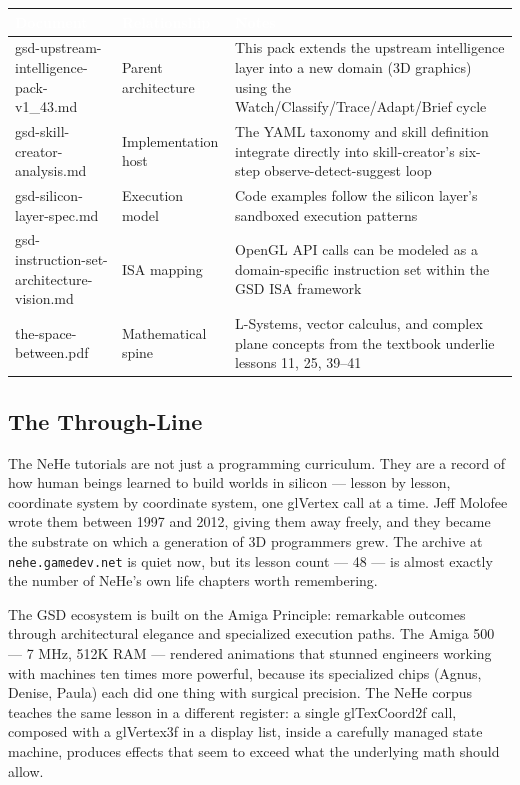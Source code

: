 \documentclass[11pt,letterpaper]{article}
\newcommand{\tableheader}[1]{\textbf{\sffamily\textcolor{white}{#1}}}
\begin{document}
\begin{center}
\begin{tabularx}{\textwidth}{L{4.5cm}L{2.5cm}X}
\toprule
{}
\tableheader{Document} & \tableheader{Relationship} & \tableheader{Notes} \\
\midrule
gsd-upstream-intelligence-pack-v1\_43.md & Parent architecture & This pack extends the upstream intelligence layer into a new domain (3D graphics) using the Watch/Classify/Trace/Adapt/Brief cycle \\
gsd-skill-creator-analysis.md & Implementation host & The YAML taxonomy and skill definition integrate directly into skill-creator's six-step observe-detect-suggest loop \\
gsd-silicon-layer-spec.md & Execution model & Code examples follow the silicon layer's sandboxed execution patterns \\
gsd-instruction-set-architecture-vision.md & ISA mapping & OpenGL API calls can be modeled as a domain-specific instruction set within the GSD ISA framework \\
the-space-between.pdf & Mathematical spine & L-Systems, vector calculus, and complex plane concepts from the textbook underlie lessons 11, 25, 39--41 \\
\bottomrule
\end{tabularx}
\end{center}

\subsection{The Through-Line}

The NeHe tutorials are not just a programming curriculum. They are a record of how human beings learned to build worlds in silicon --- lesson by lesson, coordinate system by coordinate system, one glVertex call at a time. Jeff Molofee wrote them between 1997 and 2012, giving them away freely, and they became the substrate on which a generation of 3D programmers grew. The archive at \texttt{nehe.gamedev.net} is quiet now, but its lesson count --- 48 --- is almost exactly the number of NeHe's own life chapters worth remembering.

The GSD ecosystem is built on the Amiga Principle: remarkable outcomes through architectural elegance and specialized execution paths. The Amiga 500 --- 7 MHz, 512K RAM --- rendered animations that stunned engineers working with machines ten times more powerful, because its specialized chips (Agnus, Denise, Paula) each did one thing with surgical precision. The NeHe corpus teaches the same lesson in a different register: a single glTexCoord2f call, composed with a glVertex3f in a display list, inside a carefully managed state machine, produces effects that seem to exceed what the underlying math should allow.
\end{document}

